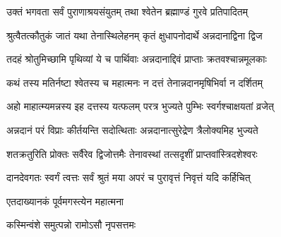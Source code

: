

\storymeta




\twolineshloka
{उक्तं भगवता सर्वं पुराणाश्रयसंयुतम्}
{तथा श्वेतेन ब्रह्माण्डं गुरवे प्रतिपादितम्}%

\twolineshloka
{श्रुत्वैतत्कौतुकं जातं यथा तेनास्थिलेहनम्}
{कृतं क्षुधापनोदार्थे अन्नदानाद्विना द्विज}%

\twolineshloka
{तदहं श्रोतुमिच्छामि पृथिव्यां ये च पार्थिवाः}
{अन्नदानाद्दिवं प्राप्ताः क्रतवश्चान्नमूलकाः}%

\twolineshloka
{कथं तस्य मतिर्नष्टा श्वेतस्य च महात्मनः}
{न दत्तं तेनान्नदानमृषिभिर्वा न दर्शितम्}%

\twolineshloka
{अहो माहात्म्यमन्नस्य इह दत्तस्य यत्फलम्}
{परत्र भुज्यते पुम्भिः स्वर्गश्चाक्षयतां व्रजेत्}%

\twolineshloka
{अन्नदानं परं विप्राः कीर्तयन्ति सदोत्थिताः}
{अन्नदानात्सुरेद्रेण त्रैलोक्यमिह भुज्यते}%

\twolineshloka
{शतक्रतुरिति प्रोक्तः सर्वैरेव द्विजोत्तमैः}
{तेनावस्थां तत्सदृशीं प्राप्तवांस्त्रिदशेश्वरः}%

\twolineshloka
{दानदेवगतः स्वर्गं त्वत्तः सर्वं श्रुतं मया}
{अपरं च पुरावृत्तं निवृत्तं यदि कर्हिचित्}%



\onelineshloka
{एतदाख्यानकं पूर्वमगस्त्येन महात्मना}%



\onelineshloka
{कस्मिन्वंशे समुत्पन्नो रामोऽसौ नृपसत्तमः}%


